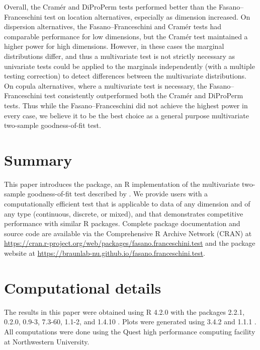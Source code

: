 Overall, the Cram\'er and DiProPerm tests performed better than the Fasano--Franceschini test on location alternatives, especially as dimension increased. On dispersion alternatives, the Fasano--Franceschini and Cram\'er tests had comparable performance for low dimensions, but the Cram\'er test maintained a higher power for high dimensions. However, in these cases the marginal distributions differ, and thus a multivariate test is not strictly necessary as univariate tests could be applied to the marginals independently (with a multiple testing correction) to detect differences between the multivariate distributions. On copula alternatives, where a multivariate test is necessary, the Fasano--Franceschini test consistently outperformed both the Cram\'er and DiProPerm tests. Thus while the Fasano--Franceschini did not achieve the highest power in every case, we believe it to be the best choice as a general purpose multivariate two-sample goodness-of-fit test.


\section{Summary}
This paper introduces the  package, an R implementation of the multivariate two-sample goodness-of-fit test described by \citet{ff1987}. We provide users with a computationally efficient test that is applicable to data of any dimension and of any type (continuous, discrete, or mixed), and that demonstrates competitive performance with similar R packages. Complete package documentation and source code are available via the Comprehensive R Archive Network (CRAN) at \url{https://cran.r-project.org/web/packages/fasano.franceschini.test} and the package website at \url{https://braunlab-nu.github.io/fasano.franceschini.test}.


\section{Computational details}
The results in this paper were obtained using R 4.2.0 with the packages  2.2.1,  0.2.0,  0.9-3,  7.3-60,  1.1-2, and  1.4.10 \citep{microbenchmarkR}. Plots were generated using  3.4.2 \citep{ggplotR} and  1.1.1 \citep{patchworkR}. All computations were done using the Quest high performance computing facility at Northwestern University.

